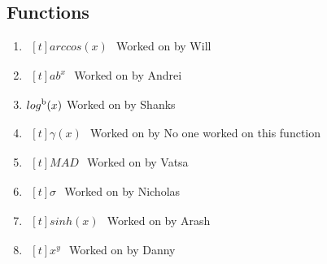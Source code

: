 \documentclass[titlepage]{article}
\begin{document}
    \subsection{Functions}
        \begin{enumerate}
            \item $\begin{aligned}[t]
                arccos(x)
            \end{aligned}$
                Worked on by Will

            \item $\begin{aligned}[t]
                ab^x
            \end{aligned}$
                Worked on by Andrei

            \item $\begin{aligned}[t]
                log\textsuperscript{b}(x)
            \end{aligned}$
                Worked on by Shanks

            \item $\begin{aligned}[t]
                \gamma(x)
            \end{aligned}$
                Worked on by No one worked on this function

            \item $\begin{aligned}[t]
                MAD
            \end{aligned}$
                Worked on by Vatsa

            \item $\begin{aligned}[t]
                \sigma
            \end{aligned}$
                Worked on by Nicholas

            \item $\begin{aligned}[t]
                sinh(x)
            \end{aligned}$
                Worked on by Arash

            \item $\begin{aligned}[t]
                x^y
            \end{aligned}$
                Worked on by Danny
        \end{enumerate}
\end{document}
